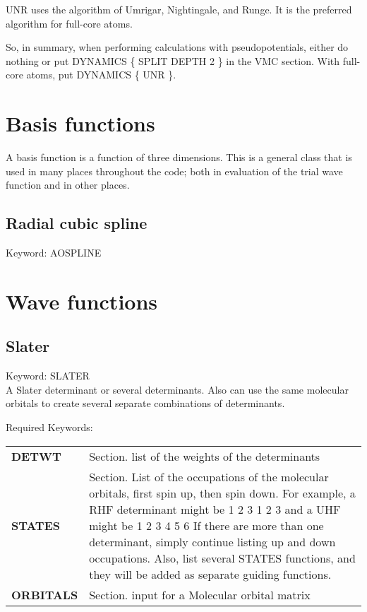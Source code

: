 \documentclass[12pt]{article}
\begin{document}
UNR uses the algorithm of Umrigar, Nightingale, and Runge.  It is the preferred 
algorithm for full-core atoms.

So, in summary, when performing calculations with pseudopotentials, either do nothing 
or put DYNAMICS \{ SPLIT DEPTH 2 \} in the VMC section.  With full-core atoms, put 
DYNAMICS \{ UNR \}.


\section{Basis functions}

A basis function is a function of three dimensions.  This is a general 
class that is used in many places throughout the code; both in evaluation of the 
trial wave function and in other places.

\subsection{Radial cubic spline}

Keyword: AOSPLINE \\




\section{Wave functions}
\subsection{Slater}

Keyword: SLATER \\


A Slater determinant or several determinants.  Also can use the same
molecular orbitals to create several separate combinations of determinants.

Required Keywords: \\
\begin{tabular}{lp{12cm}}
{\bf DETWT } & Section.  list of the weights of the determinants \\ 
{\bf STATES} & Section. List of the occupations of the molecular orbitals, first
spin up, then spin down.  For example, a RHF determinant might be 
1 2 3 
1 2 3 
and a UHF might be 
1 2 3 
4 5 6 
If there are more than one determinant, simply continue listing up and 
down occupations.  Also, list several STATES functions, and they
will be added as separate guiding functions. \\
{\bf ORBITALS} & Section. input for a Molecular orbital matrix\\
\end{tabular}
\end{document}
